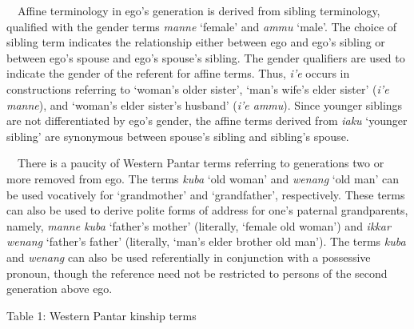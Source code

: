 \ \ Affine terminology in ego{\textquoteright}s generation is derived from sibling terminology, qualified with the gender terms \textit{manne }{\textquoteleft}female{\textquoteright} and \textit{ammu }{\textquoteleft}male{\textquoteright}. The choice of sibling term indicates the relationship either between ego and ego{\textquoteright}s sibling or between ego{\textquoteright}s spouse and ego{\textquoteright}s spouse{\textquoteright}s sibling. The gender qualifiers are used to indicate the gender of the referent for affine terms. Thus, \textit{i{\textquoteright}e }occurs in constructions referring to {\textquoteleft}woman{\textquoteright}s older sister{\textquoteright}, {\textquoteleft}man{\textquoteright}s wife{\textquoteright}s elder sister{\textquoteright} (\textit{i{\textquoteright}e manne}), and {\textquoteleft}woman{\textquoteright}s elder sister{\textquoteright}s husband{\textquoteright} (\textit{i{\textquoteright}e ammu}). Since younger siblings are not differentiated by ego{\textquoteright}s gender, 
the affine terms derived from \textit{iaku }{\textquoteleft}younger sibling{\textquoteright} are synonymous between spouse{\textquoteright}s sibling and sibling{\textquoteright}s spouse.

\ \ There is a paucity of Western Pantar terms referring to generations two or more removed from ego. The terms \textit{kuba} {\textquoteleft}old woman{\textquoteright} and \textit{wenang} {\textquoteleft}old man{\textquoteright} can be used vocatively for {\textquoteleft}grandmother{\textquoteright} and {\textquoteleft}grandfather{\textquoteright}, respectively. These terms can also be used to derive polite forms of address for one{\textquoteright}s paternal grandparents, namely, \textit{manne kuba }{\textquoteleft}father{\textquoteright}s mother{\textquoteright} (literally, {\textquoteleft}female old woman{\textquoteright}) and \textit{ikkar wenang }{\textquoteleft}father{\textquoteright}s father{\textquoteright} (literally, {\textquoteleft}man{\textquoteright}s elder brother old man{\textquoteright}). The terms \textit{kuba }and \textit{wenang }can also be used referentially in conjunction with a possessive pronoun, though the reference need not be restricted to persons of the second generation above ego.

\clearpage
Table 1: Western Pantar kinship terms

